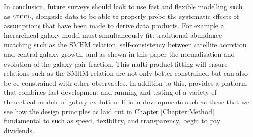 In conclusion, future surveys should look to use fast and flexible modelling such as $\textsc{steel}$, alongside data to be able to properly probe the systematic effects of assumptions that have been made to derive data products. For example a hierarchical galaxy model must simultaneously fit: traditional abundance matching such as the SMHM relation, self-consistency between satellite accretion and central galaxy growth, and as shown in this paper the normalisation and evolution of the galaxy pair fraction. This multi-product fitting will ensure relations such as the SMHM relation are not only better constrained but can also be co-constrained with other observables. In addition to this, \steel provides a platform that combines fast development and running and testing of a variety of theoretical models of galaxy evolution. Ii is in developments such as these that we see how the design principles as laid out in Chapter \ref{Chapter:Method} fundamental to \steel such as speed, flexibility, and transparency, begin to pay dividends.
